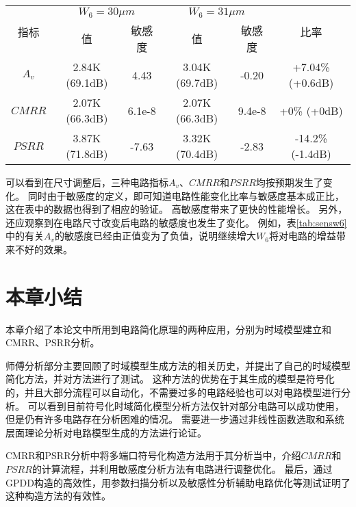 \begin{table}[!htp]
	\centering
	\begin{tabular}{c|c|c|c|c|c}
		\hline
		\multirow{2}{*}{指标} & \multicolumn{2}{c|}{$W_6=30\mu m$} & \multicolumn{2}{c|}{$W_6=31\mu m$} & \multirow{2}{*}{比率} \\ \cline{2-5}
		                    &       值        &        敏感度        &       值        &        敏感度        &  \\ \hline
		       $A_v$        & 2.84K (69.1dB) &       4.43        & 3.04K (69.7dB) &       -0.20       &  +7.04\% (+0.6dB)   \\ \hline
		      $CMRR$        & 2.07K (66.3dB) &      6.1e-8       & 2.07K (66.3dB) &      9.4e-8       &     +0\% (+0dB)     \\ \hline
		      $PSRR$        & 3.87K (71.8dB) &       -7.63       & 3.32K (70.4dB) &       -2.83       &  -14.2\% (-1.4dB)   \\ \hline
	\end{tabular}
\end{table}

可以看到在尺寸调整后，三种电路指标$A_v$、$CMRR$和$PSRR$均按预期发生了变化。
同时由于敏感度的定义，即可知道电路性能变化比率与敏感度基本成正比，这在表中的数据也得到了相应的验证。
高敏感度带来了更快的性能增长。
另外，还应观察到在电路尺寸改变后电路的敏感度也发生了变化。
例如，表\ref{tab:sensw6}中的有关$A_v$的敏感度已经由正值变为了负值，说明继续增大$W_6$将对电路的增益带来不好的效果。

\section{本章小结}

本章介绍了本论文中所用到电路简化原理的两种应用，分别为时域模型建立和CMRR、PSRR分析。

师傅分析部分主要回顾了时域模型生成方法的相关历史，并提出了自己的时域模型简化方法，并对方法进行了测试。
这种方法的优势在于其生成的模型是符号化的，并且大部分流程可以自动化，不需要过多的电路经验也可以对电路模型进行分析。
可以看到目前符号化时域简化模型分析方法仅针对部分电路可以成功使用，但是仍有许多电路存在分析困难的情况。
需要进一步通过非线性函数选取和系统层面理论分析对电路模型生成的方法进行论证。

CMRR和PSRR分析中将多端口符号化构造方法用于其分析当中，介绍$CMRR$和$PSRR$的计算流程，并利用敏感度分析方法有电路进行调整优化。
最后，通过GPDD构造的高效性，用参数扫描分析以及敏感性分析辅助电路优化等测试证明了这种构造方法的有效性。